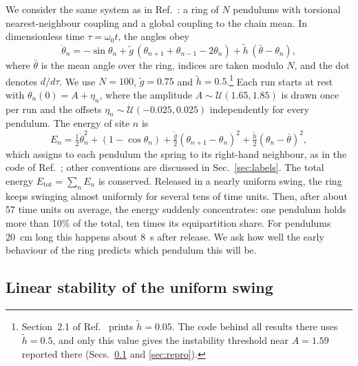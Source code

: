 \documentclass[11pt]{article}
\newcommand{\gt}{\tilde g}
\newcommand{\htl}{\tilde h}
\newcommand{\Etot}{E_{\mathrm{tot}}}
\begin{document}
We consider the same system as in Ref.~\cite{mittal2026jand}: a ring of $N$ pendulums with torsional nearest-neighbour coupling and a global coupling to the chain mean. In dimensionless time $\tau=\omega_0 t$, the angles obey
\begin{equation}
\label{eq:eom}
\ddot\theta_n = -\sin\theta_n + \gt\,(\theta_{n+1}+\theta_{n-1}-2\theta_n) + \htl\,(\bar\theta-\theta_n),
\end{equation}
where $\bar\theta$ is the mean angle over the ring, indices are taken modulo $N$, and the dot denotes $d/d\tau$. We use $N=100$, $\gt=0.75$ and $\htl=0.5$.\footnote{Section~2.1 of Ref.~\cite{mittal2026jand} prints $\htl=0.05$. The code behind all results there uses $\htl=0.5$, and only this value gives the instability threshold near $A=1.59$ reported there (Secs.~\ref{sec:floquet} and \ref{sec:repro}).} Each run starts at rest with $\theta_n(0)=A+\eta_n$, where the amplitude $A\sim\mathcal{U}(1.65,1.85)$ is drawn once per run and the offsets $\eta_n\sim\mathcal{U}(-0.025,0.025)$ independently for every pendulum. The energy of site $n$ is
\begin{equation}
\label{eq:energy}
E_n = \tfrac12\dot\theta_n^2 + (1-\cos\theta_n) + \tfrac{\gt}{2}(\theta_{n+1}-\theta_n)^2 + \tfrac{\htl}{2}(\theta_n-\bar\theta)^2 ,
\end{equation}
which assigns to each pendulum the spring to its right-hand neighbour, as in the code of Ref.~\cite{mittal2026jand}; other conventions are discussed in Sec.~\ref{sec:labels}. The total energy $\Etot=\sum_n E_n$ is conserved. Released in a nearly uniform swing, the ring keeps swinging almost uniformly for several tens of time units. Then, after about 57 time units on average, the energy suddenly concentrates: one pendulum holds more than 10\% of the total, ten times its equipartition share. For pendulums 20~cm long this happens about 8~s after release. We ask how well the early behaviour of the ring predicts which pendulum this will be.

\subsection{Linear stability of the uniform swing}
\label{sec:floquet}
\end{document}
